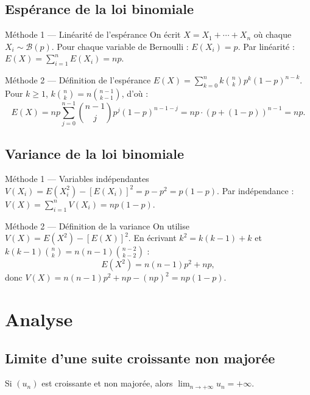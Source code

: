 \documentclass[11pt,a4paper,openany]{book}
\theoremstyle{definition}
\begin{document}
    \subsection{Espérance de la loi binomiale}

    \begin{methodebox}{Méthode 1 — Linéarité de l'espérance}
    On écrit $X=X_1+\cdots+X_n$ où chaque $X_i\sim\mathcal{B}(p)$.
    Pour chaque variable de Bernoulli : $E(X_i)=p$.
    Par linéarité : $E(X)=\displaystyle\sum_{i=1}^n E(X_i)=np$.
    \end{methodebox}

    \begin{methodebox}{Méthode 2 — Définition de l'espérance}
    $E(X)=\displaystyle\sum_{k=0}^{n}k\binom{n}{k}p^k(1-p)^{n-k}$.
    Pour $k\geq 1$, $k\binom{n}{k}=n\binom{n-1}{k-1}$, d'où :
    \[E(X)=np\sum_{j=0}^{n-1}\binom{n-1}{j}p^j(1-p)^{n-1-j}=np\cdot(p+(1-p))^{n-1}=np.\]
    \end{methodebox}

    \subsection{Variance de la loi binomiale}

    \begin{methodebox}{Méthode 1 — Variables indépendantes}
    $V(X_i)=E(X_i^2)-[E(X_i)]^2=p-p^2=p(1-p)$.
    Par indépendance : $V(X)=\displaystyle\sum_{i=1}^nV(X_i)=np(1-p)$.
    \end{methodebox}

    \begin{methodebox}{Méthode 2 — Définition de la variance}
    On utilise $V(X)=E(X^2)-[E(X)]^2$.
    En écrivant $k^2=k(k-1)+k$ et $k(k-1)\binom{n}{k}=n(n-1)\binom{n-2}{k-2}$ :
    \[E(X^2)=n(n-1)p^2+np,\]
    donc $V(X)=n(n-1)p^2+np-(np)^2=np(1-p)$.
    \end{methodebox}

    \section{Analyse}

    \subsection{Limite d'une suite croissante non majorée}

    \begin{enoncebox}
    Si $(u_n)$ est croissante et non majorée, alors $\lim_{n\to+\infty}u_n=+\infty$.
    \end{enoncebox}
\end{document}
